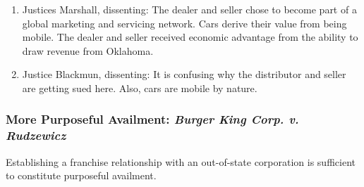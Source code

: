 \begin{enumerate}
{    Shoe} too narrowly. The seller and dealer purposefully injected their 
    product ``into the stream of interstate commerce,'' thus establishing 
    minimum contacts.\footnote{Casebook p. 196.}
    \item Justices Marshall, dissenting: The dealer and seller chose to become 
    part of a global marketing and servicing network. Cars derive their value 
    from being mobile. The dealer and seller received economic advantage from 
    the ability to draw revenue from Oklahoma.
    \item Justice Blackmun, dissenting: It is confusing why the distributor 
    and seller are getting sued here. Also, cars are mobile by nature.
\end{enumerate}

\subsubsection{More Purposeful Availment: \emph{Burger King Corp. v. Rudzewicz}}
Establishing a franchise relationship with an out-of-state corporation is 
sufficient to constitute purposeful availment.

